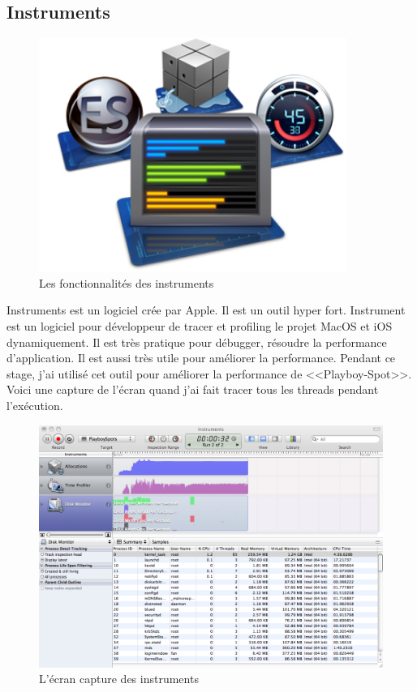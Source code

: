 
\subsection{Instruments} %
\label{sub:instrument}

\begin{figure}[htbp]
	\centering

		\includegraphics[height=3in]{Image/instrumentslogo.jpg}
	\caption{Les fonctionnalités des instruments}
	\label{fig:Image_instrumentslogo}
\end{figure}

Instruments est un logiciel crée par Apple. Il est un outil hyper fort. Instrument est un logiciel pour développeur de tracer et profiling le projet MacOS et iOS dynamiquement. Il est très pratique pour débugger, résoudre la performance d'application. Il est aussi très utile pour améliorer la performance. Pendant ce stage, j'ai utilisé cet outil pour améliorer la performance de <<Playboy-Spot>>. 
Voici une capture de l'écran quand j'ai fait tracer tous les threads pendant l'exécution. 


\begin{figure}[htbp]
	\centering
		\includegraphics[width=6in]{Image/captureInstruments.png}

	\caption{L'écran capture des instruments}
	\label{fig:Image_captureInstruments}
\end{figure}

